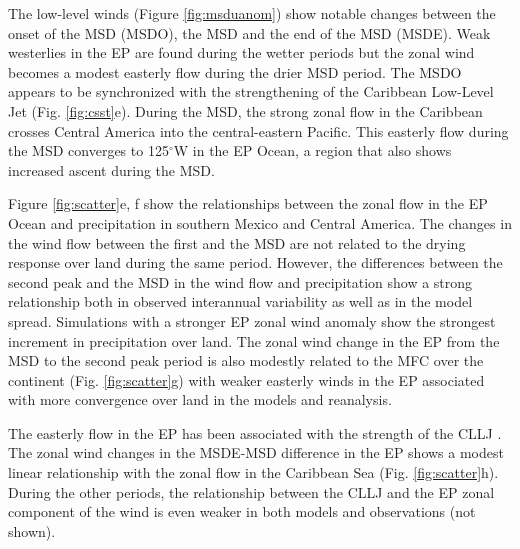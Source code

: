 The low-level winds (Figure \ref{fig:msduanom}) show notable changes between the onset of the MSD (MSDO), the MSD and the end of the MSD (MSDE).
  Weak westerlies in the EP are found during the wetter periods but the zonal wind becomes a modest easterly flow during the drier MSD period. 
  The MSDO appears to be synchronized with the strengthening of the Caribbean Low-Level Jet (Fig. \ref{fig:csst}e). During the MSD, the strong zonal flow in the Caribbean crosses Central America into the central-eastern Pacific. This easterly flow during the MSD converges to 125$^\circ$W in the EP Ocean, a region that also shows increased ascent during the MSD. 
 
Figure \ref{fig:scatter}e, f show the relationships between the zonal flow in the EP Ocean and precipitation in southern Mexico and Central America. 
The changes in the wind flow between the first and the MSD are not related to the drying response over land during the same period. 
However, the differences between the second peak and the MSD in the wind flow and precipitation show a strong relationship both in observed interannual variability as well as in the model spread. Simulations with a stronger EP zonal wind anomaly show the strongest increment in precipitation over land.
The zonal wind change in the EP from the MSD to the second peak period is also modestly related to the MFC over the continent (Fig. \ref{fig:scatter}g) with weaker easterly winds in the EP associated with more convergence over land in the models and reanalysis. 


The easterly flow in the EP has been associated with the strength of the CLLJ \citep{herrera2015}. The zonal wind changes in the MSDE-MSD difference in the EP shows a modest linear relationship with the zonal flow in the Caribbean Sea (Fig. \ref{fig:scatter}h). During the other periods, the relationship between the CLLJ and the EP zonal component of the wind is even weaker in both models and observations (not shown). 

 
